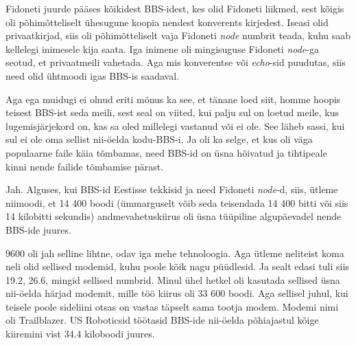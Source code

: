 
Fidoneti juurde pääses kõikidest BBS-idest, kes olid Fidoneti liikmed, sest kõigis oli põhimõtteliselt ühesugune koopia nendest konverents kirjedest. Iseasi olid privaatkirjad, siis oli põhimõtteliselt vaja Fidoneti \emph{node} numbrit teada, kuhu saab kellelegi inimesele kija saata. Iga inimene oli  mingisuguse Fidoneti \emph{node}-ga seotud, et  privaatmeili vahetada. Aga mis konverentse või \emph{echo}-sid puudutas,  siis need  olid ühtmoodi igas BBS-is  saadaval.

Aga ega muidugi ei olnud eriti mõnus ka see, et tänane loed siit, homme  hoopis teisest BBS-ist seda meili, sest seal on viited, kui palju sul on loetud meile, kus lugemisjärjekord on, kas sa oled millelegi vastanud või ei ole. See  läheb sassi, kui sul ei ole oma sellist nii-öelda kodu-BBS-i. Ja oli ka selge, et kus oli väga populaarne faile käia tõmbamas,  need BBS-id on  üsna hõivatud ja tihtipeale kinni nende failide tõmbamise pärast. 


Jah. Alguses, kui BBS-id Eestisse tekkisid ja need Fidoneti \emph{node}-d, siis, ütleme niimoodi, et 14 400 boodi (ümmarguselt võib seda teisendada 14 400 bitti või siis 14 kilobitti sekundis) andmevahetuskiirus oli üsna tüüpiline  algupäevadel nende BBS-ide juures.



9600 oli jah selline lihtne, odav iga mehe tehnoloogia. Aga ütleme neliteist koma neli olid sellised modemid, kuhu poole kõik nagu püüdlesid. Ja sealt edasi tuli siis 19.2, 26.6, mingid sellised numbrid. Minul ühel hetkel oli kasutada sellised üsna nii-öelda härjad modemit, mille töö kiirus oli 33 600 boodi. Aga sellisel juhul, kui teisele poole sideliini otsas on vastas täpselt sama tootja modem. Modemi  nimi oli Trailblazer. US Roboticsid  töötasid BBS-ide nii-öelda  põhiajastul kõige kiiremini vist 34.4 kiloboodi juures.


